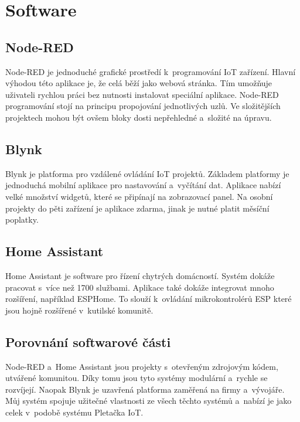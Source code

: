 \newpage

\section{Software}


\subsection{Node-RED}
Node-RED je jednoduché grafické prostředí k~programování IoT zařízení. 
Hlavní výhodou této aplikace je, že celá běží jako webová stránka. 
Tím umožňuje uživateli rychlou práci bez nutnosti instalovat speciální aplikace.
Node-RED programování stojí na principu propojování jednotlivých uzlů.
Ve složitějších projektech mohou být ovšem bloky dosti nepřehledné a~složité na úpravu.


\subsection{Blynk}
Blynk je platforma pro vzdálené ovládání IoT projektů.
Základem platformy je jednoduchá mobilní aplikace pro nastavování a~vyčítání dat.
Aplikace nabízí velké množství widgetů, které se připínají na zobrazovací panel.
Na osobní projekty do pěti zařízení je aplikace zdarma, jinak je nutné platit měsíční poplatky.


\subsection{Home Assistant}
Home Assistant je software pro řízení chytrých domácností. 
Systém dokáže pracovat s~více než 1700 službami.
Aplikace také dokáže integrovat mnoho rozšíření, například ESPHome.
To slouží k~ovládání mikrokontrolérů ESP které jsou hojně rozšířené v~kutilské komunitě.


\subsection{Porovnání softwarové části}
Node-RED a~Home Assistant jsou projekty s~otevřeným zdrojovým kódem, utvářené komunitou.
Díky tomu jsou tyto systémy modulární a~rychle se rozvíjejí. %
Naopak Blynk je uzavřená platforma zaměřená na firmy a~vývojáře.
Můj systém spojuje užitečné vlastnosti ze všech těchto systémů a~nabízí je jako celek v~podobě systému Pletačka IoT.
